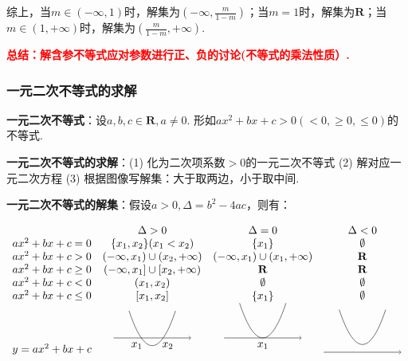 \documentclass[8pt]{article}
\begin{document}
					综上，当$m\in(-\infty, 1)$时，解集为$\displaystyle\left(-\infty, \frac{m}{1-m}\right)$；当$m=1$时，解集为$\mathbf{R}$；当$m\in(1, +\infty)$时，解集为$\displaystyle\left(\frac{m}{1-m}, +\infty\right).$

					\textcolor{red}{\textbf{总结：解含参不等式应对参数进行正、负的讨论(不等式的乘法性质）.}}

			\subsubsection{一元二次不等式的求解}
				\textbf{一元二次不等式}：设$a, b, c\in \mathbf{R}, a\neq 0$. 形如$ax^2+bx+c>0 (<0, \geq 0, \leq 0)$的不等式.

				\textbf{一元二次不等式的求解}：(1) 化为二次项系数$>0$的一元二次不等式 (2) 解对应一元二次方程 (3) 根据图像写解集：大于取两边，小于取中间.

				\textbf{一元二次不等式的解集}：假设$a>0, \Delta=b^2-4ac$，则有：

				$$
				\begin{array}{cccc}
					&\Delta>0&\Delta=0&\Delta<0\\
			    	ax^2+bx+c=0&\{x_1, x_2\} (x_1 < x_2)&\{x_1\}&\emptyset\\
			    	ax^2+bx+c>0&(-\infty, x_1)\cup(x_2, +\infty)&(-\infty, x_1)\cup(x_1, +\infty)&\mathbf{R}\\
			    	ax^2+bx+c\geq0&(-\infty, x_1]\cup[x_2, +\infty)&\mathbf{R}&\mathbf{R}\\
			    	ax^2+bx+c<0&(x_1, x_2)&\emptyset&\emptyset\\
			    	ax^2+bx+c\leq0&[x_1, x_2]&\{x_1\}&\emptyset\\
			    	y=ax^2+bx+c&
			    	\begin{tikzpicture}[scale=0.25]
			    		\draw[black, ->] (-5, 0)--(5, 0);
			    		\draw[black, domain=-3:3] plot(\x,0.5*\x*\x-1) node at (-2, -1){$x_1$} node at (2, -1){$x_2$};
			    	\end{tikzpicture}&
			    	\begin{tikzpicture}[scale=0.25]
			    		\draw[black, ->] (-5, 0)--(5, 0);
			    		\draw[black, domain=-3:3] plot(\x,0.5*\x*\x) node at (0, -1){$x_1$};
			    	\end{tikzpicture}&
			    	\begin{tikzpicture}[scale=0.25]
			    		\draw[black, ->] (-5, 0)--(5, 0);
			    		\draw[black, domain=-3:3] plot(\x,0.5*\x*\x+1);
			    	\end{tikzpicture}\\
				\end{array}
				$$
\end{document}
